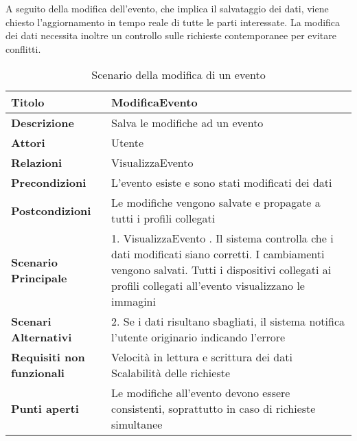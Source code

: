 \clearpage

A seguito della modifica dell'evento, che implica il salvataggio dei dati, viene chiesto l'aggiornamento in tempo reale di tutte le parti interessate.
La modifica dei dati necessita inoltre un controllo sulle richieste contemporanee per evitare conflitti.\\
\begin{table}[htb]
    \begin{tabular} {|P{4.5cm}|P{11cm}|}
        \hline
        \textbf{Titolo}                   & ModificaEvento                                                                               \\
        \hline
        \textbf{Descrizione}              & Salva le modifiche ad un evento                                                              \\
        \hline
        \textbf{Attori}                   & Utente                                                                                       \\
        \hline
        \textbf{Relazioni}                & VisualizzaEvento                                                                             \\
        \hline
        \textbf{Precondizioni}            & L'evento esiste e sono stati modificati dei dati                                             \\
        \hline
        \textbf{Postcondizioni}           & Le modifiche vengono salvate e propagate a tutti i profili collegati                         \\
        \hline
        \textbf{Scenario Principale}      & 1. VisualizzaEvento . Il sistema controlla che i dati modificati siano corretti. I cambiamenti vengono salvati. Tutti i dispositivi collegati ai profili collegati all'evento visualizzano le immagini                                        \\
        \hline
        \textbf{Scenari Alternativi}      & 2. Se i dati risultano sbagliati, il sistema notifica l'utente originario indicando l'errore \\
        \hline
        \textbf{Requisiti non funzionali} & Velocità in lettura e scrittura dei dati \newline
        Scalabilità delle richieste                                                                                                      \\
        \hline
        \textbf{Punti aperti}             & Le modifiche all'evento devono essere consistenti, soprattutto in caso di richieste simultanee     \\
        \hline
    \end{tabular}
    \caption{Scenario della modifica di un evento}
\end{table}

